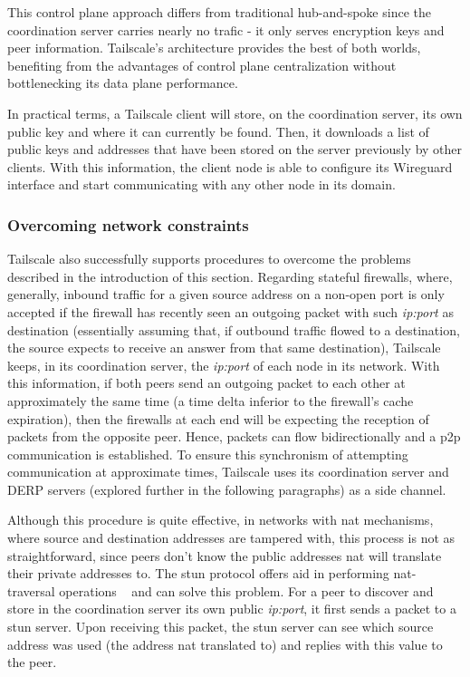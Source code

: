 \documentclass[11pt,twoside,a4paper]{report}
\begin{document}
This control plane approach differs from traditional hub-and-spoke since the coordination server carries nearly no trafic - it only serves encryption keys and peer information. Tailscale's architecture provides the best of both worlds, benefiting from the advantages of control plane centralization without bottlenecking its data plane performance.

In practical terms, a Tailscale client will store, on the coordination server, its own public key and where it can currently be found. Then, it downloads a list of public keys and addresses that have been stored on the server previously by other clients. With this information, the client node is able to configure its Wireguard interface and start communicating with any other node in its domain.

\subsubsection{Overcoming network constraints}

Tailscale also successfully supports procedures to overcome the problems described in the introduction of this section. Regarding stateful firewalls, where, generally, inbound traffic for a given source address on a non-open port is only accepted if the firewall has recently seen an outgoing packet with such \emph{ip:port} as destination (essentially assuming that, if outbound traffic flowed to a destination, the source expects to receive an answer from that same destination), Tailscale keeps, in its coordination server, the \emph{ip:port} of each node in its network. With this information, if both peers send an outgoing packet to each other at approximately the same time (a time delta inferior to the firewall's cache expiration), then the firewalls at each end will be expecting the reception of packets from the opposite peer. Hence, packets can flow bidirectionally and a \ac{p2p} communication is established. To ensure this synchronism of attempting communication at approximate times, Tailscale uses its coordination server and \ac{DERP} servers (explored further in the following paragraphs) as a side channel.

Although this procedure is quite effective, in networks with \ac{nat} mechanisms, where source and destination addresses are tampered with, this process is not as straightforward, since peers don't know the public addresses \ac{nat} will translate their private addresses to. The \ac{stun} protocol offers aid in performing \ac{nat}-traversal operations ~\cite{rfc8489} and can solve this problem. For a peer to discover and store in the coordination server its own public \emph{ip:port}, it first sends a packet to a \ac{stun} server. Upon receiving this packet, the \ac{stun} server can see which source address was used (the address \ac{nat} translated to) and replies with this value to the peer.
\end{document}

